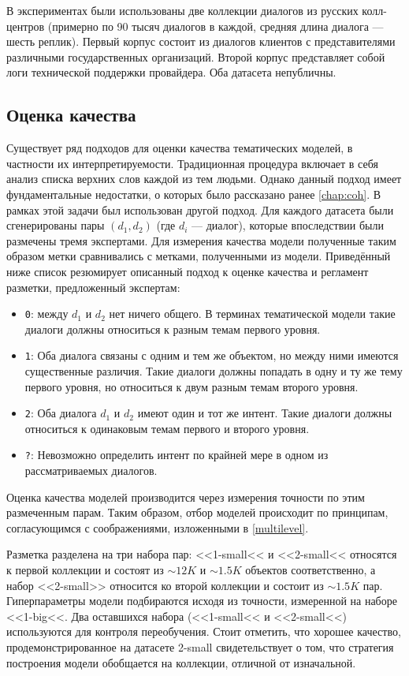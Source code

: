 В экспериментах были использованы две коллекции диалогов из русских колл-центров (примерно по 90 тысяч диалогов в каждой, средняя длина диалога --- шесть реплик). Первый корпус состоит из диалогов клиентов с представителями различными государственных организаций. Второй корпус представляет собой логи технической поддержки провайдера. Оба датасета непубличны.

\subsection{Оценка качества}

Существует ряд подходов для оценки качества тематических моделей, в частности их интерпретируемости. Традиционная процедура включает в себя анализ списка верхних слов каждой из тем людьми. Однако данный подход имеет фундаментальные недостатки, о которых было рассказано ранее \ref{chap:coh}. В рамках этой задачи был использован другой подход.
Для каждого датасета были сгенерированы пары $(d_1, d_2)$ (где $d_i$ --- диалог), которые впоследствии были размечены тремя экспертами. Для измерения качества модели полученные таким образом метки сравнивались с метками, полученными из модели.
Приведённый ниже список резюмирует описанный подход к оценке качества и регламент разметки, предложенный экспертам:
\begin{itemize}
    \item \texttt{0}: между $d_1$ и $d_2$ нет ничего общего. В терминах тематической модели такие диалоги должны относиться к разным темам первого уровня.
    \item \texttt{1}: Оба диалога связаны с одним и тем же объектом, но между ними имеются существенные различия. Такие диалоги должны попадать в одну и ту же тему первого уровня, но относиться к двум разным темам второго уровня.
    \item \texttt{2}: Оба диалога $d_1$ и $d_2$ имеют один и тот же интент. Такие диалоги должны относиться к одинаковым темам первого и второго уровня.
    \item \texttt{?}: Невозможно определить интент по крайней мере в одном из рассматриваемых диалогов.
\end{itemize}

Оценка качества моделей производится через измерения точности по этим размеченным парам. Таким образом, отбор моделей происходит по принципам, согласующимся с соображениями, изложенными в \ref{multilevel}.

Разметка разделена на три набора пар: <<1-small<< и <<2-small<< относятся к первой коллекции и состоят из $\sim\!12K$ и $\sim1.5K$ объектов соответственно, а набор <<2-small>> относится ко второй коллекции и состоит из $\sim\!1.5K$ пар. Гиперпараметры модели подбираются исходя из точности, измеренной на  наборе <<1-big<<. Два оставшихся набора (<<1-small<< и <<2-small<<) используются для контроля переобучения. Стоит отметить, что хорошее качество, продемонстрированное на датасете 2-small свидетельствует о том, что стратегия построения модели обобщается на коллекции, отличной от изначальной.



